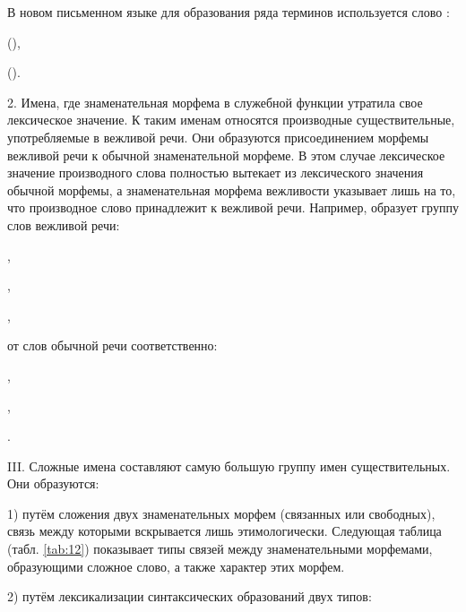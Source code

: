 В новом письменном языке для образования ряда терминов используется слово :
\begin{prfsample}
    \item {} (),
    \item {} ().
\end{prfsample}

2. Имена, где знаменательная морфема в служебной функции утратила свое лексическое значение. К таким именам относятся производные существительные, употребляемые в вежливой речи. Они образуются присоединением морфемы вежливой речи к обычной знаменательной морфеме. В этом случае лексическое значение производного слова полностью вытекает из лексического значения обычной морфемы, а знаменательная морфема вежливости указывает лишь на то, что производное слово принадлежит к вежливой речи. Например,  образует группу слов вежливой речи:
\begin{prfsample}
    \item {},
    \item {},
    \item {},
\end{prfsample}
от слов обычной речи соответственно:
\begin{prfsample}
    \item {},
    \item {},
    \item {}.
\end{prfsample}

III. Сложные имена составляют самую большую группу имен существительных. Они образуются:

1) путём сложения двух знаменательных морфем (связанных или свободных), связь между которыми вскрывается лишь этимологически. Следующая таблица (табл. \ref{tab:12}) показывает типы связей между знаменательными морфемами, образующими сложное слово, а также характер этих морфем.

2) путём лексикализации синтаксических образований двух типов:

